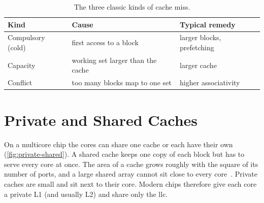 \begin{table}[htbp]
\centering
\caption{The three classic kinds of cache miss.}
\label{tab:three-c}
\small
\begin{tabular}{@{}l p{5.4cm} p{4.0cm}@{}}
\toprule
Kind & Cause & Typical remedy \\
\midrule
Compulsory (cold) & first access to a block & larger blocks, prefetching \\
Capacity & working set larger than the cache & larger cache \\
Conflict & too many blocks map to one set & higher associativity \\
\bottomrule
\end{tabular}
\end{table}

\section{Private and Shared Caches}
\label{sec:cache-private}

On a multicore chip the cores can share one cache or each have their own
(\cref{fig:private-shared}). A shared cache keeps one copy of each block but has
to serve every core at once. The area of a cache grows roughly with the square of
its number of ports, and a large shared array cannot sit close to every
core~\cite[\S12.4.4]{sarangi2025basic}. Private caches are small and sit next to
their core. Modern chips therefore give each core a private L1 (and usually L2)
and share only the \gls{llc}.

